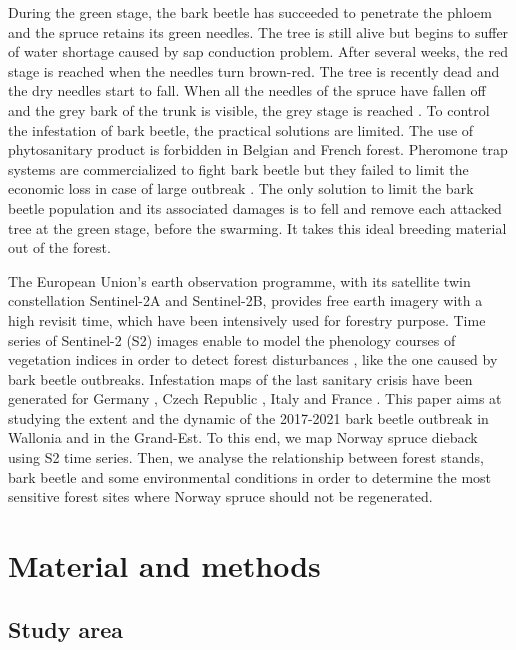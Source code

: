 \documentclass[3p,procedia]{elsarticle}
\begin{document}
During the green stage, the bark beetle has succeeded to penetrate the phloem and the spruce retains its green needles. 
The tree is still alive but begins to suffer of water shortage caused by sap conduction problem. 
After several weeks, the red stage is reached when the needles turn brown-red. The tree is recently dead and the dry needles start to fall.
When all the needles of the spruce have fallen off and the grey bark of the trunk is visible, the grey stage is reached \citep{abdullah_european_2018}. 
To control the infestation of bark beetle, the practical solutions are limited. 
The use of phytosanitary product is forbidden in Belgian and French forest.
Pheromone trap systems are commercialized to fight bark beetle but they failed to limit the economic loss in case of large outbreak \citep{kuhn_pheromone_2022}.
The only solution to limit the bark beetle population and its associated damages is to fell and remove each attacked tree at the green stage, before the swarming.
It takes this ideal breeding material out of the forest.

The European Union’s earth observation programme, with its satellite twin constellation Sentinel-2A and Sentinel-2B, provides free earth imagery with a high revisit time, which have been intensively used for forestry purpose. 
Time series of Sentinel-2 (S2) images enable to model the phenology courses of vegetation indices in order to detect forest disturbances \citep{low_phenology_2020}, like the one caused by bark beetle outbreaks.
Infestation maps of the last sanitary crisis have been generated for Germany \citep{ali_canopy_2021,thonfeld_first_2022}, Czech Republic \citep{barta_early_2021}, Italy \citep{dalponte_mapping_2022} and France \citep{nardi_drought_2022}. 
This paper aims at studying the extent and the dynamic of the 2017-2021 bark beetle outbreak in Wallonia and in the Grand-Est.
To this end, we map Norway spruce dieback using S2 time series.
Then, we analyse the relationship between forest stands, bark beetle and some environmental conditions in order to determine the most sensitive forest sites where Norway spruce should not be regenerated.


\section{Material and methods}
\subsection{Study area}
\end{document}
